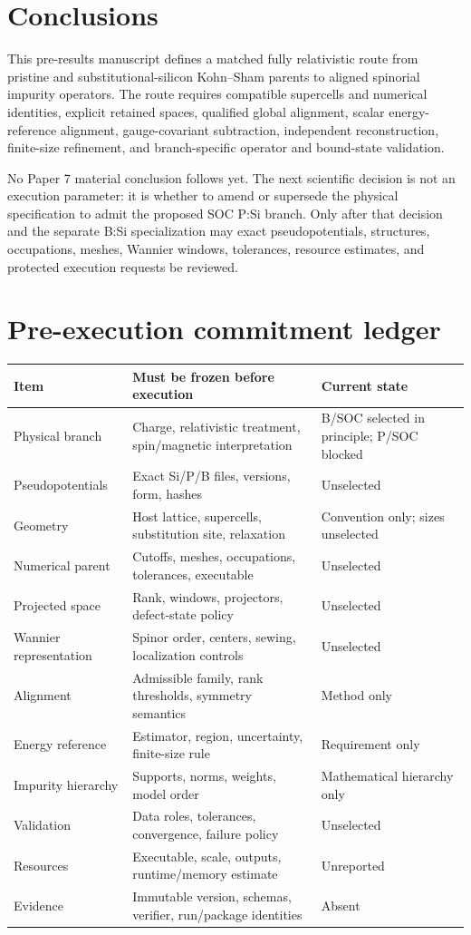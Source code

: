 \documentclass[11pt]{article}
\begin{document}
\section{Conclusions}
This pre-results manuscript defines a matched fully relativistic route from pristine and
substitutional-silicon Kohn--Sham parents to aligned spinorial impurity operators. The
route requires compatible supercells and numerical identities, explicit retained spaces,
qualified global alignment, scalar energy-reference alignment, gauge-covariant
subtraction, independent reconstruction, finite-size refinement, and branch-specific
operator and bound-state validation.

No Paper 7 material conclusion follows yet. The next scientific decision is not an
execution parameter: it is whether to amend or supersede the physical specification to
admit the proposed SOC P:Si branch. Only after that decision and the separate B:Si
specialization may exact pseudopotentials, structures, occupations, meshes, Wannier
windows, tolerances, resource estimates, and protected execution requests be reviewed.

\appendix
\section{Pre-execution commitment ledger}
\begin{center}\small
\begin{tabularx}{\textwidth}{YYY}
\toprule
\textbf{Item} & \textbf{Must be frozen before execution} & \textbf{Current state} \\
\midrule
Physical branch & Charge, relativistic treatment, spin/magnetic interpretation & B/SOC selected in principle; P/SOC blocked \\
Pseudopotentials & Exact Si/P/B files, versions, form, hashes & Unselected \\
Geometry & Host lattice, supercells, substitution site, relaxation & Convention only; sizes unselected \\
Numerical parent & Cutoffs, meshes, occupations, tolerances, executable & Unselected \\
Projected space & Rank, windows, projectors, defect-state policy & Unselected \\
Wannier representation & Spinor order, centers, sewing, localization controls & Unselected \\
Alignment & Admissible family, rank thresholds, symmetry semantics & Method only \\
Energy reference & Estimator, region, uncertainty, finite-size rule & Requirement only \\
Impurity hierarchy & Supports, norms, weights, model order & Mathematical hierarchy only \\
Validation & Data roles, tolerances, convergence, failure policy & Unselected \\
Resources & Executable, scale, outputs, runtime/memory estimate & Unreported \\
Evidence & Immutable version, schemas, verifier, run/package identities & Absent \\
\bottomrule
\end{tabularx}
\end{center}
\end{document}
